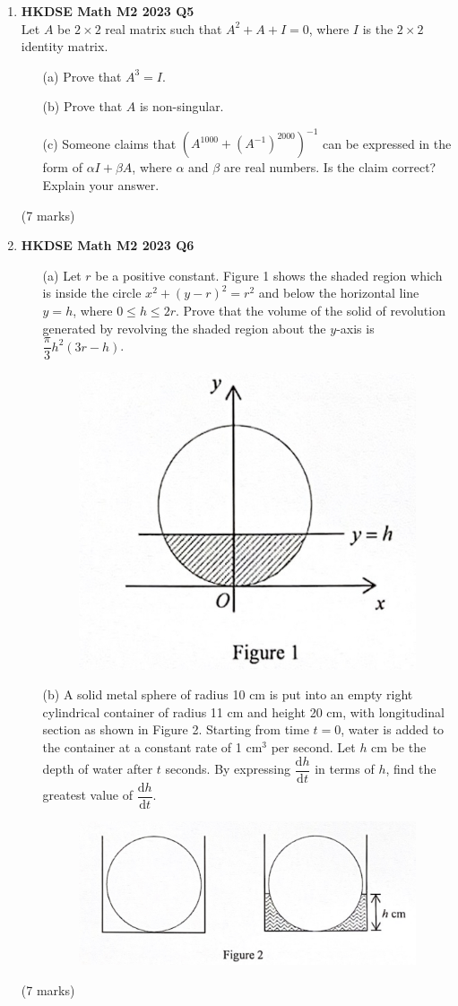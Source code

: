 \documentclass[12pt]{article}
\begin{document}
\begin{enumerate}
	\item \textbf{HKDSE Math M2 2023 Q5}\\
	Let $A$ be $2\times2$ real matrix such that $A^2 + A + I = 0$, where $I$ is the $2\times2$ identity matrix. 
	\begin{enumerate}
		\item [(a)]Prove that $A^3 = I$.
		\item [(b)]Prove that $A$ is non-singular.
		\item [(c)]Someone claims that $\left(A^{1000} + (A^{-1})^{2000}\right)^{-1}$ can be expressed in the form of $\alpha I + \beta A$, where $\alpha$ and $\beta$ are real numbers. Is the claim correct? Explain your answer.
	\end{enumerate}
	(7 marks)


	\item \textbf{HKDSE Math M2 2023 Q6}
	\begin{enumerate}
		\item [(a)]Let $r$ be a positive constant. Figure 1 shows the shaded region which is inside the circle $x^2 + (y-r)^2 = r^2$ and below the horizontal line $y = h$, where $0 \leq h \leq 2r$. Prove that the volume of the solid of revolution generated by revolving the shaded region about the $y$-axis is $\dfrac{\pi}{3}h^2(3r-h)$.
		\begin{figure}[H]
			\centering
			\includegraphics[width = .5\linewidth]{2023Figure1}
		\end{figure}
		\item [(b)]A solid metal sphere of radius 10 cm is put into an empty right cylindrical container of radius 11 cm and height 20 cm, with longitudinal section as shown in Figure 2. Starting from time $t=0$, water is added to the container at a constant rate of 1 cm$^3$ per second. Let $h$ cm be the depth of water after $t$ seconds. By expressing $\dfrac{\text{d}h}{\text{d}t}$ in terms of $h$, find the greatest value of $\dfrac{\text{d}h}{\text{d}t}$.
		\begin{figure}[H]
			\centering
			\includegraphics[width = .5\linewidth]{2023Figure2}
		\end{figure}
	\end{enumerate}
	(7 marks)


\end{enumerate}
\end{document}
